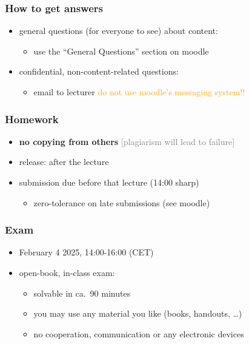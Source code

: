 \documentclass[fleqn,10pt,serif,xcolor=svgnames,xcolor=table,aspectratio=169,handout]{beamer}
\newcommand{\mycom}[1]{\hfill {\mygray{[#1]}}}
\newcommand{\mygray}[1]{\textcolor{gray}{#1}}
\begin{document}
\begin{frame}
  \frametitle{How to get answers}
  \begin{itemize}
    \item general questions (for everyone to see) about content:
    \begin{itemize}
      \item use the ``General Questions'' section on moodle
    \end{itemize}
    \item confidential, non-content-related questions:
    \begin{itemize}
      \item email to lecturer \hfill \textcolor{orange}{do not use moodle's messaging system!!}
    \end{itemize}
  \end{itemize}
\end{frame}

\begin{frame}
  \frametitle{Homework}
  \begin{itemize}
    \item \textbf{no copying from others} \hfill \mycom{plagiarism will lead to failure}
    \item release: after the lecture
    \item submission due before that lecture (14:00 sharp)
    \begin{itemize}
      \item zero-tolerance on late submissions (see moodle)
    \end{itemize}
  \end{itemize}
\end{frame}

\begin{frame}
  \frametitle{Exam}
  \begin{itemize}
    \item February 4 2025, 14:00-16:00 (CET)
    \item open-book, in-class exam:
    \begin{itemize}
      \item solvable in ca.~90 minutes
      \item you may use any material you like (books, handouts, \dots)
      \item no cooperation, communication or any electronic devices
    \end{itemize}
  \end{itemize}
\end{frame}
\end{document}
